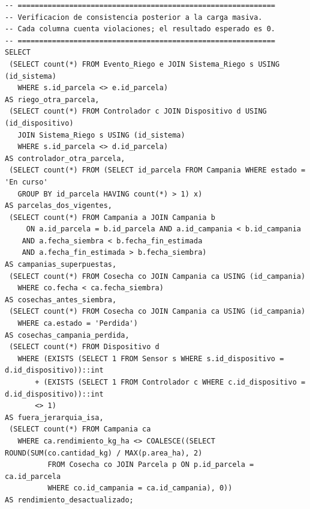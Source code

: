 \documentclass[11pt,letterpaper]{article}
\begin{document}
\begin{lstlisting}[style=sql, title={07\_verificacion.sql}]
-- ============================================================
-- Verificacion de consistencia posterior a la carga masiva.
-- Cada columna cuenta violaciones; el resultado esperado es 0.
-- ============================================================
SELECT
 (SELECT count(*) FROM Evento_Riego e JOIN Sistema_Riego s USING (id_sistema)
   WHERE s.id_parcela <> e.id_parcela)                                   AS riego_otra_parcela,
 (SELECT count(*) FROM Controlador c JOIN Dispositivo d USING (id_dispositivo)
   JOIN Sistema_Riego s USING (id_sistema)
   WHERE s.id_parcela <> d.id_parcela)                                   AS controlador_otra_parcela,
 (SELECT count(*) FROM (SELECT id_parcela FROM Campania WHERE estado = 'En curso'
   GROUP BY id_parcela HAVING count(*) > 1) x)                           AS parcelas_dos_vigentes,
 (SELECT count(*) FROM Campania a JOIN Campania b
     ON a.id_parcela = b.id_parcela AND a.id_campania < b.id_campania
    AND a.fecha_siembra < b.fecha_fin_estimada
    AND a.fecha_fin_estimada > b.fecha_siembra)                          AS campanias_superpuestas,
 (SELECT count(*) FROM Cosecha co JOIN Campania ca USING (id_campania)
   WHERE co.fecha < ca.fecha_siembra)                                    AS cosechas_antes_siembra,
 (SELECT count(*) FROM Cosecha co JOIN Campania ca USING (id_campania)
   WHERE ca.estado = 'Perdida')                                          AS cosechas_campania_perdida,
 (SELECT count(*) FROM Dispositivo d
   WHERE (EXISTS (SELECT 1 FROM Sensor s WHERE s.id_dispositivo = d.id_dispositivo))::int
       + (EXISTS (SELECT 1 FROM Controlador c WHERE c.id_dispositivo = d.id_dispositivo))::int
       <> 1)                                                             AS fuera_jerarquia_isa,
 (SELECT count(*) FROM Campania ca
   WHERE ca.rendimiento_kg_ha <> COALESCE((SELECT ROUND(SUM(co.cantidad_kg) / MAX(p.area_ha), 2)
          FROM Cosecha co JOIN Parcela p ON p.id_parcela = ca.id_parcela
          WHERE co.id_campania = ca.id_campania), 0))                    AS rendimiento_desactualizado;
\end{lstlisting}
\end{document}
